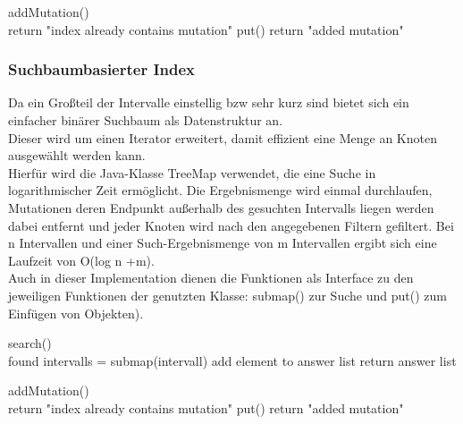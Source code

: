 \documentclass[]{article}
\begin{document}
\begin{algorithm}
addMutation()\\{
{return "index already contains mutation"\;}
put()\;
return "added mutation"\;
}
\end{algorithm}

\newpage
\subsubsection{Suchbaumbasierter Index}
Da ein Großteil der Intervalle einstellig bzw sehr kurz sind bietet sich ein einfacher binärer Suchbaum als Datenstruktur an.\\
Dieser wird um einen Iterator erweitert, damit effizient eine Menge an Knoten ausgewählt werden kann.\\
Hierfür wird die Java-Klasse TreeMap verwendet, die eine Suche in logarithmischer Zeit ermöglicht. Die Ergebnismenge wird einmal durchlaufen, Mutationen deren Endpunkt außerhalb des gesuchten Intervalls liegen werden dabei entfernt und jeder Knoten wird nach den angegebenen Filtern gefiltert. Bei n Intervallen und einer Such-Ergebnismenge von m Intervallen ergibt sich eine Laufzeit von O(log n +m).\\
Auch in dieser Implementation dienen die Funktionen als Interface zu den jeweiligen Funktionen der genutzten Klasse: submap() zur Suche und put() zum Einfügen von Objekten).
\begin{algorithm}
search()\\{
found intervalls = submap(intervall)\;
{
{
{add element to answer list\;}
}
return answer list\;
}
}
\end{algorithm}


\begin{algorithm}
addMutation()\\{
{return "index already contains mutation"\;}
put()\;
return "added mutation"\;
}
\end{algorithm}

\newpage
\end{document}
